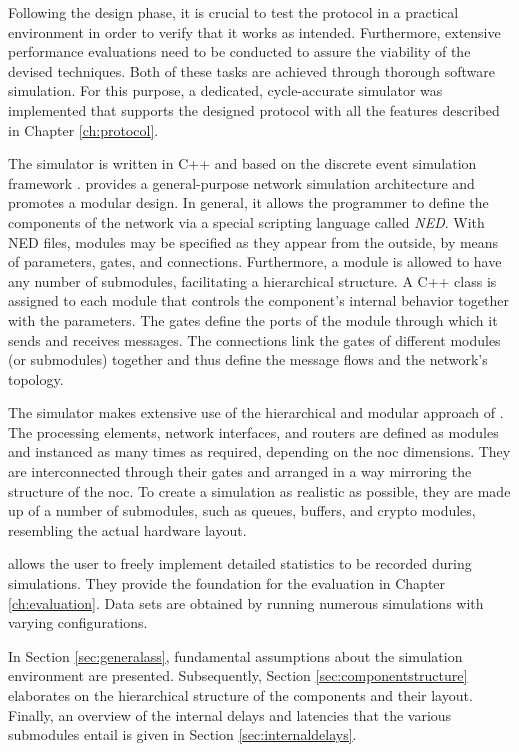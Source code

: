 Following the design phase, it is crucial to test the protocol in a practical environment in order to verify that it works as intended. Furthermore,
extensive performance evaluations need to be conducted to assure the viability of the devised techniques. Both of these tasks are achieved through
thorough software simulation. For this purpose, a dedicated, cycle-accurate simulator was implemented that supports the designed protocol with all the
features described in Chapter \ref{ch:protocol}.

The simulator is written in C++ and based on the \textit{\omnet{}} discrete event simulation framework \cite{omnet}. \omnet{} provides a general-purpose
network simulation architecture and promotes a modular design. In general, it allows the programmer to define the components of the network via a
special scripting language called \textit{NED}. With NED files, modules may be specified as they appear from the outside, by means of parameters,
gates, and connections. Furthermore, a module is allowed to have any number of submodules, facilitating a hierarchical structure. A C++
class is assigned to each module that controls the component's internal behavior together with the parameters. The gates define the ports of the
module through which it sends and receives messages. The connections link the gates of different modules (or submodules) together and thus define the
message flows and the network's topology.

The simulator makes extensive use of the hierarchical and modular approach of \omnet{}. The processing elements, network interfaces, and routers are
defined as modules and instanced as many times as required, depending on the \gls{noc} dimensions. They are interconnected through their gates and
arranged in a way mirroring the structure of the \gls{noc}. To create a simulation as realistic as possible, they are made up of a number of
submodules, such as queues, buffers, and crypto modules, resembling the actual hardware layout.

\omnet{} allows the user to freely implement detailed statistics to be recorded during simulations. They provide the foundation for the evaluation
in Chapter \ref{ch:evaluation}. Data sets are obtained by running numerous simulations with varying configurations.

In Section \ref{sec:generalass}, fundamental assumptions about the simulation environment are presented. Subsequently, Section
\ref{sec:componentstructure} elaborates on the hierarchical structure of the components and their layout. Finally, an overview of the internal delays
and latencies that the various submodules entail is given in Section \ref{sec:internaldelays}.

